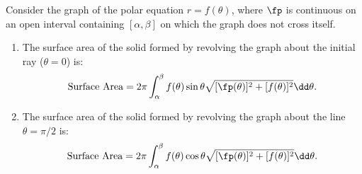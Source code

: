 \begin{keyidea}\label{idea:surface_area_polar}
Consider the graph of the polar equation $r=f(\theta)$, where $\fp$ is continuous on an open interval containing $[\alpha,\beta]$ on which the graph does not cross itself.
\begin{enumerate}
	\item The surface area of the solid formed by revolving the graph about the initial ray ($\theta=0$) is:
	\[\text{Surface Area} = 2\pi\int_\alpha^\beta f(\theta)\sin\theta\sqrt{[\fp(\theta)]^2+[f(\theta)]^2}\dd\theta.\]
	\item The surface area of the solid formed by revolving the graph about the line $\theta=\pi/2$ is:
	\[\text{Surface Area} = 2\pi\int_\alpha^\beta f(\theta)\cos\theta\sqrt{[\fp(\theta)]^2+[f(\theta)]^2}\dd\theta.\]
\end{enumerate}
\end{keyidea}


